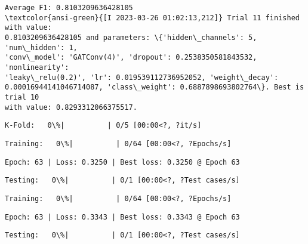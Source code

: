 \documentclass[11pt]{article}
\begin{document}
    
    \begin{Verbatim}[commandchars=\\\{\}]
Average F1: 0.8103209636428105
\textcolor{ansi-green}{[I 2023-03-26 01:02:13,212]} Trial 11 finished with value:
0.8103209636428105 and parameters: \{'hidden\_channels': 5, 'num\_hidden': 1,
'conv\_model': 'GATConv(4)', 'dropout': 0.2538350581843532, 'nonlinearity':
'leaky\_relu(0.2)', 'lr': 0.019539112736952052, 'weight\_decay':
0.00016944141046714087, 'class\_weight': 0.6887898693802764\}. Best is trial 10
with value: 0.8293312066375517.
    \end{Verbatim}

    
    \begin{Verbatim}[commandchars=\\\{\}]
K-Fold:   0\%|          | 0/5 [00:00<?, ?it/s]
    \end{Verbatim}

    
    
    \begin{Verbatim}[commandchars=\\\{\}]
Training:   0\%|          | 0/64 [00:00<?, ?Epochs/s]
    \end{Verbatim}

    
    \begin{Verbatim}[commandchars=\\\{\}]
Epoch: 63 | Loss: 0.3250 | Best loss: 0.3250 @ Epoch 63
    \end{Verbatim}

    
    \begin{Verbatim}[commandchars=\\\{\}]
Testing:   0\%|          | 0/1 [00:00<?, ?Test cases/s]
    \end{Verbatim}

    
    
    \begin{Verbatim}[commandchars=\\\{\}]
Training:   0\%|          | 0/64 [00:00<?, ?Epochs/s]
    \end{Verbatim}

    
    \begin{Verbatim}[commandchars=\\\{\}]
Epoch: 63 | Loss: 0.3343 | Best loss: 0.3343 @ Epoch 63
    \end{Verbatim}

    
    \begin{Verbatim}[commandchars=\\\{\}]
Testing:   0\%|          | 0/1 [00:00<?, ?Test cases/s]
    \end{Verbatim}
\end{document}

